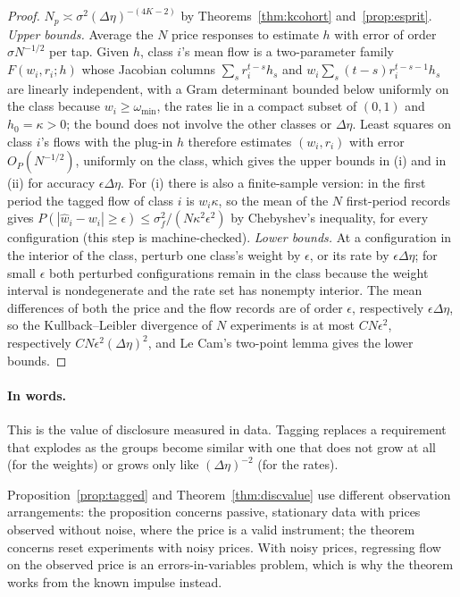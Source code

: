 \documentclass[12pt]{article}
\theoremstyle{definition}
\theoremstyle{remark}
\begin{document}
\begin{proof}
$N_p\asymp\sigma^2(\Delta\eta)^{-(4K-2)}$ by Theorems~\ref{thm:kcohort} and~\ref{prop:esprit}. \emph{Upper bounds.} Average the $N$ price responses to estimate $h$ with error of order $\sigma N^{-1/2}$ per tap. Given $h$, class $i$'s mean flow is a two-parameter family $F(w_i,r_i;h)$ whose Jacobian columns $\sum_sr_i^{t-s}h_s$ and $w_i\sum_s(t-s)r_i^{t-s-1}h_s$ are linearly independent, with a Gram determinant bounded below uniformly on the class because $w_i\ge\omega_{\min}$, the rates lie in a compact subset of $(0,1)$ and $h_0=\kappa>0$; the bound does not involve the other classes or $\Delta\eta$. Least squares on class $i$'s flows with the plug-in $h$ therefore estimates $(w_i,r_i)$ with error $O_P(N^{-1/2})$, uniformly on the class, which gives the upper bounds in (i) and in (ii) for accuracy $\epsilon\Delta\eta$. For (i) there is also a finite-sample version: in the first period the tagged flow of class $i$ is $w_i\kappa$, so the mean of the $N$ first-period records gives $P(|\hat w_i-w_i|\ge\epsilon)\le\sigma_f^2/(N\kappa^2\epsilon^2)$ by Chebyshev's inequality, for every configuration (this step is machine-checked). \emph{Lower bounds.} At a configuration in the interior of the class, perturb one class's weight by $\epsilon$, or its rate by $\epsilon\Delta\eta$; for small $\epsilon$ both perturbed configurations remain in the class because the weight interval is nondegenerate and the rate set has nonempty interior. The mean differences of both the price and the flow records are of order $\epsilon$, respectively $\epsilon\Delta\eta$, so the Kullback--Leibler divergence of $N$ experiments is at most $CN\epsilon^2$, respectively $CN\epsilon^2(\Delta\eta)^2$, and Le Cam's two-point lemma gives the lower bounds.
\end{proof}

\paragraph{In words.} This is the value of disclosure measured in data. Tagging replaces a requirement that explodes as the groups become similar with one that does not grow at all (for the weights) or grows only like $(\Delta\eta)^{-2}$ (for the rates).


Proposition~\ref{prop:tagged} and Theorem~\ref{thm:discvalue} use different observation arrangements: the proposition concerns passive, stationary data with prices observed without noise, where the price is a valid instrument; the theorem concerns reset experiments with noisy prices. With noisy prices, regressing flow on the observed price is an errors-in-variables problem, which is why the theorem works from the known impulse instead.
\end{document}
